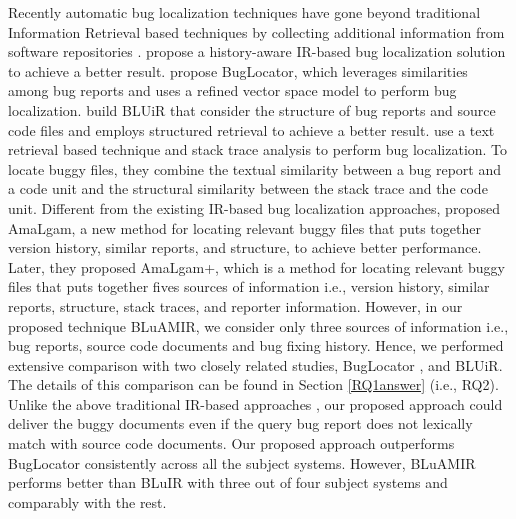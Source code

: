\documentclass[sigconf,review,anonymous]{acmart}
\begin{document}
Recently automatic bug localization techniques have gone beyond traditional
Information Retrieval based techniques by collecting additional information from software repositories \cite{Sisman, Jian, Saha, Moreno, Wang}.
\citet{Sisman} propose a history-aware IR-based bug localization solution to achieve a better
result. \citet{Jian} propose BugLocator, which leverages similarities among bug reports and uses a refined vector space model to perform bug localization. \citet{Saha} build BLUiR that consider the structure of bug reports and source code files and employs structured retrieval to achieve a better result. \citet{Moreno} use a text retrieval based technique and stack trace analysis to perform bug localization. To locate buggy files, they combine the textual similarity between a bug report and a code unit and the structural similarity between the stack trace and the code unit. Different from the existing IR-based bug localization approaches, \citet{Wang} proposed AmaLgam, a new method for locating relevant buggy files that puts together version history, similar reports, and structure, to achieve better performance. 
Later, they proposed AmaLgam+\cite{Wang2}, which is a method for locating relevant buggy files that puts together fives sources of information i.e., version history, similar reports, structure, stack traces, and reporter information. 
However, in our proposed technique BLuAMIR, we consider only three sources of information i.e., bug reports, source code documents and bug fixing history. 
Hence, we performed extensive comparison with two closely related studies, BugLocator \cite{Jian}, and BLUiR\cite{Saha}.
The details of this comparison can be found in Section \ref{RQ1answer} (i.e., RQ2).
Unlike the above traditional IR-based approaches \cite{Sisman, Jian, Saha, Moreno, Wang, Wang2}, our proposed approach could deliver the buggy documents even if the query bug report does not lexically match with source code documents.
Our proposed approach outperforms BugLocator \cite{Jian} consistently across all the subject systems. However, BLuAMIR performs better than BLuIR \cite{Saha} with three out of four subject systems and comparably with the rest. 
\end{document}
